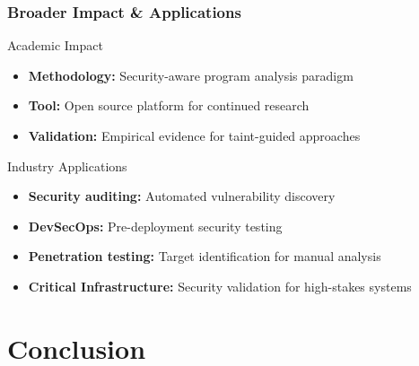 \documentclass[aspectratio=169]{beamer}
\begin{document}
\begin{frame}
    \frametitle{Broader Impact \& Applications}
    \begin{research}{Academic Impact}
        \begin{itemize}
            \item \textbf{Methodology:} Security-aware program analysis paradigm
            \item \textbf{Tool:} Open source platform for continued research
            \item \textbf{Validation:} Empirical evidence for taint-guided approaches
        \end{itemize}
    \end{research}
    
    \vspace{1em}
    \begin{implementation}{Industry Applications}
        \begin{itemize}
            \item \textbf{Security auditing:} Automated vulnerability discovery
            \item \textbf{DevSecOps:} Pre-deployment security testing
            \item \textbf{Penetration testing:} Target identification for manual analysis
            \item \textbf{Critical Infrastructure:} Security validation for high-stakes systems
        \end{itemize}
    \end{implementation}
\end{frame}

\section{Conclusion}
\end{document}
